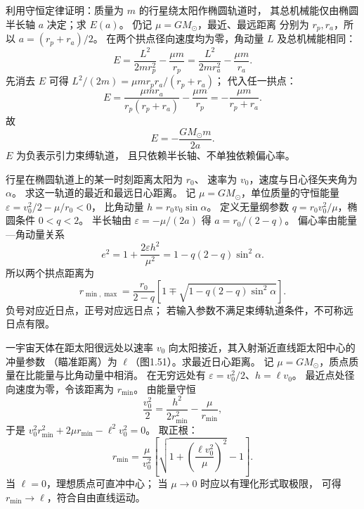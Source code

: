 利用守恒定律证明：质量为 $m$ 的行星绕太阳作椭圆轨道时，
其总机械能仅由椭圆半长轴 $a$ 决定；求 $E(a)$。
\exsolution
仍记 $\mu=GM_\odot$，最近、最远距离
分别为 $r_p,r_a$，所以 $a=(r_p+r_a)/2$。
在两个拱点径向速度均为零，角动量 $L$
及总机械能相同：
\[
E=\frac{L^2}{2mr_p^2}-\frac{\mu m}{r_p}
=\frac{L^2}{2mr_a^2}-\frac{\mu m}{r_a}.
\]
先消去 $E$ 可得
$L^2/(2m)=\mu m r_pr_a/(r_p+r_a)$；
代入任一拱点：
\[
E=\frac{\mu m r_a}{r_p(r_p+r_a)}
-\frac{\mu m}{r_p}
=-\frac{\mu m}{r_p+r_a}.
\]
故
\[
\boxed{E=-\frac{GM_\odot m}{2a}}.
\]
\excheck $E$ 为负表示引力束缚轨道，
且只依赖半长轴、不单独依赖偏心率。

行星在椭圆轨道上的某一时刻距离太阳为 $r_0$、
速率为 $v_0$，速度与日心径矢夹角为 $\alpha$。
求这一轨道的最近和最远日心距离。
\exsolution
记 $\mu=GM_\odot$，单位质量的守恒能量
$\varepsilon=v_0^2/2-\mu/r_0<0$，
比角动量 $h=r_0v_0\sin\alpha$。
定义无量纲参数
$q=r_0v_0^2/\mu$，椭圆条件 $0<q<2$。
半长轴由 $\varepsilon=-\mu/(2a)$ 得
$a=r_0/(2-q)$。
偏心率由能量—角动量关系
\[
e^2=1+\frac{2\varepsilon h^2}{\mu^2}
=1-q(2-q)\sin^2\alpha.
\]
所以两个拱点距离为
\[
\boxed{r_{\min,\max}=
\frac{r_0}{2-q}
\left[1\mp\sqrt{1-q(2-q)\sin^2\alpha}\right]}.
\]
\excheck 负号对应近日点，正号对应远日点；
若输入参数不满足束缚轨道条件，不可称远日点有限。

一宇宙天体在距太阳很远处以速率 $v_0$
向太阳接近，其入射渐近直线距太阳中心的冲量参数
（瞄准距离）为 $\ell$（图1.51）。求最近日心距离。
\exsolution
记 $\mu=GM_\odot$，质点质量在比能量与比角动量中相消。
在无穷远处有
$\varepsilon=v_0^2/2$、$h=\ell v_0$。
最近点处径向速度为零，令该距离为 $r_{\min}$。
由能量守恒
\[
\frac{v_0^2}{2}
=\frac{h^2}{2r_{\min}^2}-\frac{\mu}{r_{\min}},
\]
于是
$v_0^2r_{\min}^2+2\mu r_{\min}-\ell^2v_0^2=0$。
取正根：
\[
\boxed{r_{\min}=\frac{\mu}{v_0^2}
\left[\sqrt{1+\left(\frac{\ell v_0^2}{\mu}\right)^2}-1\right]}.
\]
\excheck 当 $\ell=0$，理想质点可直冲中心；
当 $\mu\to0$ 时应以有理化形式取极限，
可得 $r_{\min}\to\ell$，符合自由直线运动。
